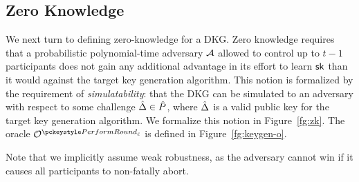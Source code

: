 \subsection{Zero Knowledge}
\label{defn:zk}

We next turn to defining zero-knowledge for a DKG.
Zero knowledge requires that a probabilistic polynomial-time adversary $\mathcal{A}$ allowed to control up to $t-1$ participants does not gain any additional advantage in its effort to learn $\mathsf{sk}$ than it would against the target key generation algorithm.
This notion is formalized by the requirement of \emph{simulatability}:
that the DKG can be simulated to an adversary with respect to some challenge $\hat{\Delta} \in \hat{P}$,
where $\hat{\Delta}$ is a valid public key for the target key generation algorithm.
We formalize this notion in Figure~\ref{fg:zk}.
The oracle $\oraclekg$ is defined in Figure~\ref{fg:keygen-o}.

Note that we implicitly assume weak robustness,
as the adversary cannot win if it causes all participants to non-fatally abort.

